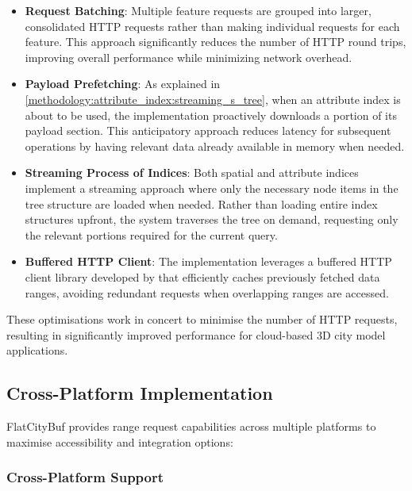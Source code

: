 \begin{itemize}
  \item \textbf{Request Batching}: Multiple feature requests are grouped into larger, consolidated HTTP requests rather than making individual requests for each feature. This approach significantly reduces the number of HTTP round trips, improving overall performance while minimizing network overhead.
  \item \textbf{Payload Prefetching}: As explained in \autoref{methodology:attribute_index:streaming_s_tree}, when an attribute index is about to be used, the implementation proactively downloads a portion of its payload section. This anticipatory approach reduces latency for subsequent operations by having relevant data already available in memory when needed.

  \item \textbf{Streaming Process of Indices}: Both spatial and attribute indices implement a streaming approach where only the necessary node items in the tree structure are loaded when needed. Rather than loading entire index structures upfront, the system traverses the tree on demand, requesting only the relevant portions required for the current query.

  \item \textbf{Buffered HTTP Client}: The implementation leverages a buffered HTTP client library developed by \citet{buffered_http_range_client} that efficiently caches previously fetched data ranges, avoiding redundant requests when overlapping ranges are accessed.

\end{itemize}

These optimisations work in concert to minimise the number of HTTP requests, resulting in significantly improved performance for cloud-based 3D city model applications.

\subsection{Cross-Platform Implementation}
\label{methodology:http_range_requests:cross_platform_implementation}

FlatCityBuf provides range request capabilities across multiple platforms to maximise accessibility and integration options:
\subsubsection{Cross-Platform Support}
\label{methodology:http_range_requests:cross_platform_implementation:cross_platform}

